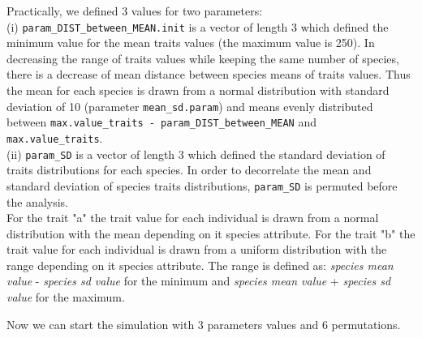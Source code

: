\documentclass[12pt]{article}\usepackage[]{graphicx}\usepackage[]{color}
\begin{document}
 Practically, we defined 3 values for two parameters:
\\

 (i) \texttt{param\_{}DIST\_{}between\_{}MEAN.init} is a vector of length 3 which defined the minimum value for the mean traits values (the maximum value is 250). In decreasing the range of traits values while keeping the same number of species, there is a decrease of mean distance between species means of traits values. Thus the mean for each species is drawn from a normal distribution with standard deviation of 10 (parameter \texttt{mean\_{}sd.param}) and means evenly distributed between \texttt{max.value\_{}traits - param\_{}DIST\_{}between\_{}MEAN} and \texttt{max.value\_{}traits}.
\\

(ii) \texttt{param\_{}SD} is a vector of length 3 which defined the standard deviation of traits distributions for each species. In order to decorrelate the mean and standard deviation of species traits distributions, \texttt{param\_{}SD} is permuted before the analysis. 
\\

For the trait "a" the trait value for each individual is drawn from a normal distribution with the mean depending on it species attribute. For the trait "b" the trait value for each individual is drawn from a uniform distribution with the range depending on it species attribute. The range is defined as: \textit{species mean value} - \textit{species sd value} for the minimum and \textit{species mean value} + \textit{species sd value} for the maximum.

Now we can start the simulation with 3 parameters values and 6 permutations. 
\end{document}

